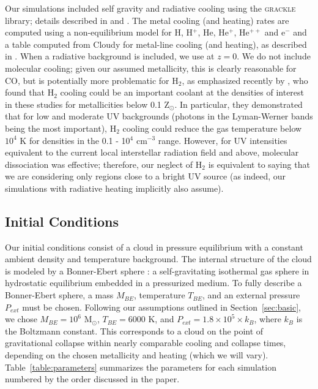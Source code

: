 \documentclass[useAMS,usenatbib]{mn2e}
\newcommand{\msun}{{M$_\odot$}}
\begin{document}
Our simulations included self gravity and radiative cooling using the
\textsc{grackle} library; details described in \cite{Bryan2014} and \cite{Smith2016}. The metal cooling (and
heating) rates are computed using a non-equilibrium model for H, H$^+$, He, He$^+$, He$^{++}$ and e$^-$
and a table computed from Cloudy for metal-line cooling (and heating), as described in \citet{Smith2016}.
When a radiative background is included, we use \cite{Haardt2012} at $z=0$.  We do not include molecular
cooling; given our assumed metallicity, this is clearly reasonable for CO, but is potentially more problematic
for H$_2$, as emphasized recently by \citet{Glover2014}, who found that H$_2$ cooling could be an important
coolant at the densities of interest in these studies for metallicities below 0.1 Z$_\odot$.  In particular, they
demonstrated that for low and moderate UV backgrounds (photons in the Lyman-Werner bands being the
most important), H$_2$ cooling could reduce the gas temperature below $10^4$ K for densities in the 0.1 - 10$^4$ 
cm$^{-3}$ range.  However, for UV intensities equivalent to the current local interstellar radiation field and above,
molecular dissociation was effective; therefore, our neglect of H$_2$ is equivalent to saying that we are
considering only regions close to a bright UV source (as indeed, our simulations with radiative heating
implicitly also assume).


\subsection{Initial Conditions}

Our initial conditions consist of a cloud in pressure equilibrium with a
constant ambient density and temperature background. The internal structure of the
cloud is modeled by a Bonner-Ebert sphere \citep{Bonnor1956}: a self-gravitating
isothermal gas sphere in hydrostatic equilibrium embedded in a pressurized  
medium. To fully describe a Bonner-Ebert sphere, a mass $M_{BE}$, temperature
$T_{BE}$, and an external pressure $P_{ext}$ must be chosen. Following our
assumptions outlined in Section~\ref{sec:basic}, we chose
$M_{BE}=10^6$ \msun, $T_{BE}=6000$ K, and $P_{ext}=1.8\times10^5\times k_B$, 
where $k_B$ is the Boltzmann constant. This corresponds to a cloud on the point of
gravitational collapse within nearly comparable cooling and collapse times,
depending on the chosen metallicity and heating (which we will vary). Table~\ref{table:parameters}
summarizes the parameters for each simulation numbered by the order discussed in the paper.
\end{document}
